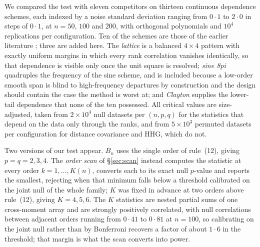 %
%
%

We compared the test with eleven competitors on thirteen continuous dependence
schemes, each indexed by a noise standard deviation ranging from $0{\cdot}1$ to
$2{\cdot}0$ in steps of $0{\cdot}1$, at $n = 50$, $100$ and $200$, with
orthogonal polynomials and $10^4$ replications per configuration. Ten of the
schemes are those of the earlier literature \citep{New09, Hel13, Sim14, Rud17};
three are added here. The \textit{lattice} is a balanced $4\times4$ pattern with
exactly uniform margins in which every rank correlation vanishes identically, so
that dependence is visible only once the unit square is resolved;
\textit{sine 8pi} quadruples the frequency of the sine scheme, and is included
because a low-order smooth span is blind to high-frequency departures by
construction and the design should contain the case the method is worst at; and
\textit{Clayton} supplies the lower-tail dependence that none of the ten
possessed. All critical values are size-adjusted, taken from $2\times10^4$ null
datasets per $(n,p,q)$ for the statistics that depend on the data only through
the ranks, and from $5\times10^3$ permuted datasets per configuration for
distance covariance and HHG, which do not.

Two versions of our test appear. $B_n$ uses the single order of rule~(12),
giving $p = q = 2, 3, 4$. The \textit{order scan} of \S\ref{sec:scan} instead
computes the statistic at every order $k = 1,\ldots,K(n)$, converts each to its
exact null $p$-value and reports the smallest, rejecting when that minimum falls
below a threshold calibrated on the joint null of the whole family; $K$ was fixed
in advance at two orders above rule~(12), giving $K = 4, 5, 6$. The $K$
statistics are nested partial sums of one cross-moment array and are strongly
positively correlated, with null correlations between adjacent orders running
from $0{\cdot}41$ to $0{\cdot}81$ at $n = 100$, so calibrating on the joint null
rather than by Bonferroni recovers a factor of about $1{\cdot}6$ in the
threshold; that margin is what the scan converts into power.

